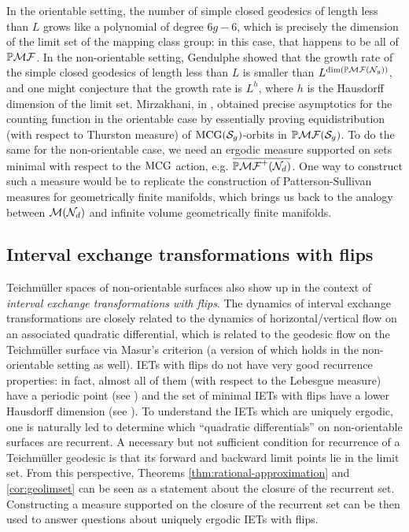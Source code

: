\documentclass[12pt, reqno]{amsart}
\begin{document}
In the orientable setting, the number of simple closed geodesics of length less than $L$ grows like a polynomial of degree $6g-6$, which is precisely the dimension of the limit set of the mapping class group: in this case, that happens to be all of $\mathbb{P}\mathcal{MF}$.
In the non-orientable setting, Gendulphe showed that the growth rate of the simple closed geodesics of length less than $L$ is smaller than $L^{\dim(\mathbb{P}\mathcal{MF}(\mathcal{N}_g))}$, and one might conjecture that the growth rate is $L^h$, where $h$ is the Hausdorff dimension of the limit set.
Mirzakhani, in \autocite{mirzakhani2008growth}, obtained precise asymptotics for the counting function in the orientable case by essentially proving equidistribution (with respect to Thurston measure) of $\mathrm{MCG}(\mathcal{S}_{g})$-orbits in $\mathbb{P}\mathcal{MF}(\mathcal{S}_g)$.
To do the same for the non-orientable case, we need an ergodic measure supported on sets
minimal with respect to the $\mathrm{MCG}$ action, e.g. $\overline{\mathbb{P}\mathcal{MF}^+(\mathcal{N}_d)}$.
One way to construct such a measure would be to replicate the construction of Patterson-Sullivan measures for geometrically finite manifolds, which brings us back
to the analogy between $\mathcal{M}(\mathcal{N}_d)$ and infinite volume geometrically finite manifolds.

\subsection*{Interval exchange transformations with flips}

Teichm\"uller spaces of non-orientable surfaces also show up in the context of \emph{interval exchange transformations with flips}.
The dynamics of interval exchange transformations are closely related to the dynamics of horizontal/vertical flow on an associated quadratic differential, which is related to the geodesic flow on the Teichm\"uller surface via Masur's criterion (a version of which holds in the non-orientable setting as well).
IETs with flips do not have very good recurrence properties: in fact, almost all of them (with respect to the Lebesgue measure) have a periodic point (see \cite{nogueira_1989}) and the set of minimal IETs with flips have a lower Hausdorff dimension (see \cite{skripchenko2018hausdorff}).
To understand the IETs which are uniquely ergodic, one is naturally led to determine which ``quadratic differentials'' on non-orientable surfaces are recurrent.
A necessary but not sufficient condition for recurrence of a Teichm\"uller geodesic is that its forward and backward limit points lie in the limit set.
From this perspective, Theorems \ref{thm:rational-approximation} and \ref{cor:geolimset} can
be seen as a statement about the closure of the recurrent set.
Constructing a measure supported on the closure of the recurrent set can be then used to answer questions about uniquely ergodic IETs with flips.
\end{document}
